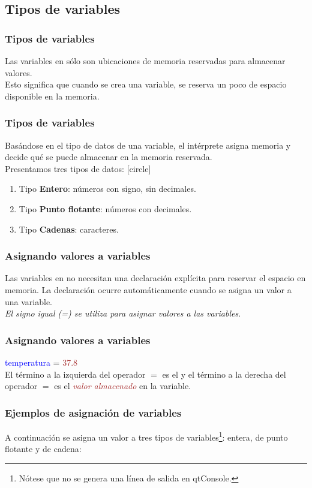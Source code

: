 {\subsection{Tipos de variables}
\begin{frame}
\frametitle{Tipos de variables}
Las variables en \python{} sólo son ubicaciones de memoria reservadas para almacenar valores.
\\
\bigskip
Esto significa que cuando se crea una variable, se reserva un poco de espacio disponible en la memoria.
\end{frame}
\begin{frame}
\frametitle{Tipos de variables}
Basándose en el tipo de datos de una variable, el intérprete asigna memoria y decide qué se puede almacenar en la memoria reservada.
\\
\bigskip
Presentamos tres tipos de datos:
[circle]
\begin{enumerate}[<+->]
\item Tipo \textbf{Entero}: números con signo, sin decimales.
\item Tipo \textbf{Punto flotante}: números con decimales.
\item Tipo \textbf{Cadenas}: caracteres.
\end{enumerate}
\end{frame}
\begin{frame}
\frametitle{Asignando valores a variables}
Las variables en \python{} no necesitan una declaración explícita para reservar el espacio en memoria. La declaración ocurre automáticamente cuando se asigna un valor a una variable.
\\
\bigskip
\pause
\emph{El signo igual (=) se utiliza para asignar valores a las variables}.
\end{frame}
\begin{frame}[fragile]
\frametitle{Asignando valores a variables}
\textcolor{blue}{temperatura} = \textcolor{brown}{37.8}
\\
\bigskip
El término a la izquierda del operador $=$ es el  y el término a la derecha del operador $=$ es el \textcolor{brown}{\emph{valor almacenado}} en la variable.
\end{frame}
\begin{frame}[fragile]
\frametitle{Ejemplos de asignación de variables}
A continuación se asigna un valor a tres tipos de variables\footnote{Nótese que no se genera una línea de salida en qtConsole.}: entera, de punto flotante y de cadena:

\end{frame}}

